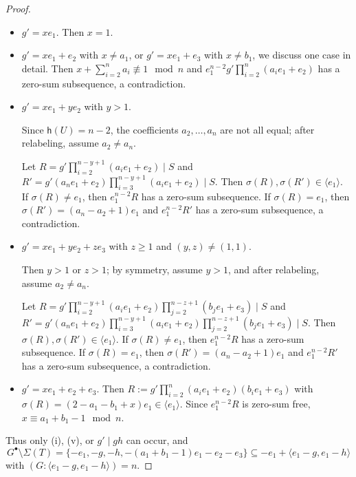 \documentclass[a4paper, 10pt]{amsart}
\theoremstyle{plain}
\theoremstyle{definition}
\numberwithin{equation}{section}
\begin{document}
{\begin{proof}
	
	
	\begin{itemize}
		\item[(i)] $g'=xe_1$. Then $x=1$.
		
		\item[(ii)] $g'=xe_1+e_2$ with $x\ne a_1$, or
		$g'=xe_1+e_3$ with $x\ne b_1$, we  discuss one case in detail. Then $x+\sum_{i=2}^n a_i \not\equiv  1 \mod{n}$ and $e_1^{n-2}g'\prod_{i=2}^{n} (a_ie_1+e_2)$ has a zero-sum subsequence, a contradiction.
		
		\item[(iii)]  $g'=xe_1+ye_2$ with $y> 1$. 
		
		Since $\mathsf h(U)=n-2$, the coefficients $a_2,\ldots,a_n$ are not all equal; after relabeling, assume $a_2\ne a_n$.
		
		Let $R=g'\prod_{i=2}^{n-y+1} (a_ie_1+e_2)\mid S$ and $R'=g'(a_ne_1+e_2)\prod_{i=3}^{n-y+1} (a_ie_1+e_2)\mid S$. Then $\sigma(R),\sigma(R') \in \langle e_1 \rangle$. If $\sigma(R)\ne  e_1$, then $e_1^{n-2}R$ has a zero-sum subsequence. If $\sigma(R)=  e_1$, then $\sigma(R')= (a_n-a_2+1) e_1$
		and $e_1^{n-2}R'$ has a zero-sum subsequence, a contradiction.
		
		\item[(iv)] $g'=xe_1+ye_2+ze_3$ with $z\ge 1$ and $(y,z)\ne (1,1)$. 
		
		Then $y>1$ or $z>1$; by symmetry, assume $y>1$, and after relabeling, assume $a_2\ne a_n$.
		
		Let $R=g'\prod_{i=2}^{n-y+1} (a_ie_1+e_2)\prod_{j=2}^{n-z+1} (b_je_1+e_3)\mid S$ and $R'=g'(a_ne_1+e_2)\prod_{i=3}^{n-y+1} (a_ie_1+e_2)\prod_{j=2}^{n-z+1} (b_je_1+e_3)\mid S$. Then $\sigma(R),\sigma(R') \in \langle e_1 \rangle$. If $\sigma(R)\ne  e_1$, then $e_1^{n-2}R$ has a zero-sum subsequence. If $\sigma(R)=  e_1$, then $\sigma(R')= (a_n-a_2+1) e_1$
		and $e_1^{n-2}R'$ has a zero-sum subsequence, a contradiction.
		
		\item[(v)] $g'=xe_1+e_2+e_3$. Then $R:=g'\prod_{i=2}^n (a_ie_1+e_2)(b_ie_1+e_3)$ with $\sigma(R)=(2-a_1-b_1+x)e_1\in \langle e_1 \rangle$. Since $e_1^{n-2}R$ is zero-sum free, $x\equiv a_1+b_1-1\mod n$.
	\end{itemize}
	
	Thus only (i), (v), or $g'\mid gh$ can occur, and
	\[
	G^{\bullet}\setminus \Sigma (T)=\{-e_1,-g,-h, -(a_1+b_1-1)e_1-e_2-e_3\}\subseteq -e_1+ \langle e_1-g,e_1-h \rangle
	\] 
	with $(G:\langle e_1-g, e_1-h \rangle)=n$.
	

\end{proof}}
\end{document}
